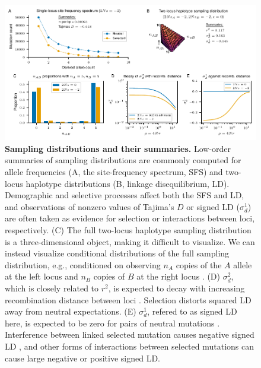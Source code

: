 \documentclass[]{article}
\begin{document}
\begin{figure}[tb!]
    \internallinenumbers
    \centering
    \includegraphics{../figures/two-locus-spectrum/stats_summaries}
    \caption{
        \textbf{Sampling distributions and their summaries.}
        Low-order summaries of sampling distributions are commonly computed
        for allele frequencies (A, the site-frequency spectrum, SFS)
        and two-locus haplotype distributions (B, linkage disequilibrium, LD).
        Demographic and selective processes affect both the SFS and LD,
        and observations of nonzero values of Tajima's $D$ or signed LD
        ($\sigma_d^1$) are often taken as evidence for selection or interactions
        between loci, respectively.
        (C) The full two-locus haplotype sampling distribution is a three-dimensional
        object, making it difficult to visualize. We can instead visualize conditional
        distributions of the full sampling distribution, e.g., conditioned on observing
        \(n_A\) copies of the \(A\) allele at the left locus and \(n_B\) copies of
        \(B\) at the right locus \citep[e.g.,][]{Hudson2001-sg}.
        (D) $\sigma_d^2$, which is closely related to $r^2$, is expected to decay
        with increasing recombination distance between loci \citep{Ohta1969-ie}.
        Selection distorts squared LD away from neutral expectations.
        (E) $\sigma_d^1$, refered to as signed LD here, is expected to be zero for
        pairs of neutral mutations \citep{Hill1968-vu}. Interference between linked
        selected mutation causes negative signed LD \citep{Hill1966-gv}, and other
        forms of interactions between selected mutations can cause large negative
        or positive signed LD.
    }
    \label{fig:TwoLocusFS}
\end{figure}
\end{document}
